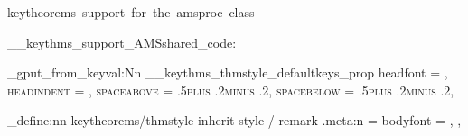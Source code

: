   {keytheorems~support~for~the~amsproc~class}

\__keythms_support_AMSshared_code:

\prop_gput_from_keyval:Nn \g__keythms_thmstyle_defaultkeys_prop
  {
    headfont      = \scshape,
    headindent    = \parindent,
    spaceabove    = .5\baselineskip plus .2\baselineskip minus .2\baselineskip,
    spacebelow    = .5\baselineskip plus .2\baselineskip minus .2\baselineskip,
  }

\keys_define:nn { keytheorems/thmstyle }
  {
    inherit-style / remark .meta:n =
      {
        bodyfont = \normalfont,
      },
  }